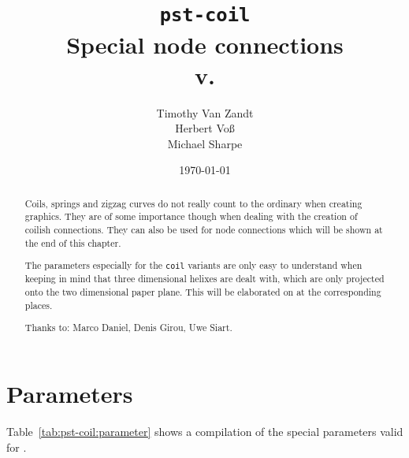 \documentclass[11pt,english,BCOR10mm,DIV12,bibliography=totoc,parskip=false,smallheadings
    headexclude,footexclude,oneside,dvipsnames,svgnames]{pst-doc}
\let\pstFV\fileversion
\begin{document}
\title{\texttt{pst-coil}\\Special node connections \\\small v.\pstFV}
\author{Timothy Van Zandt\\Herbert Vo\ss\\Michael Sharpe}
\date{\today}

\maketitle

\begin{abstract}
Coils, springs and zigzag curves
do not really count to the ordinary when creating graphics. They are of some
importance though when dealing with the creation of coilish connections. They
can also be used for node connections which will be shown
at the end of this chapter.

The parameters especially for the \verb+coil+ variants are only easy to
understand when keeping in mind that three dimensional helixes are dealt with,
which are only projected onto the two dimensional paper plane. This will be
elaborated on at the corresponding places.

\vfill
\noindent
Thanks to:  
Marco Daniel, Denis Girou, Uwe Siart.
\end{abstract}

\clearpage
\tableofcontents

\clearpage
\section{Parameters}\label{sec:pstcoil:parameter}
Table~\ref{tab:pst-coil:parameter} shows a compilation of the special parameters
valid for .
\end{document}
